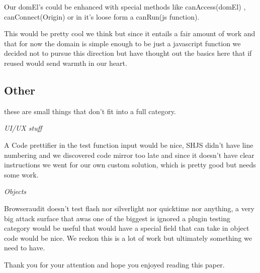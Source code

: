 Our domEl's could be enhanced with special methods like canAccess(domEl) , canConnect(Origin) or in it's loose form a canRun(js function).

This would be pretty cool we think but since it entails a fair amount of work and that for now the domain is simple enough to be just a javascript
function we decided not to pursue this direction but have thought out the basics here that if reused would send warmth in our heart. 

\subsection{Other}

these are small things that don't fit into a full category.

\emph{UI/UX stuff}

A Code prettifier in the test function input would be nice, SHJS didn't have line numbering and we discovered code mirror too late and since it doesn't have
clear instructions we went for our own custom solution, which is pretty good but needs some work.

\emph{Objects}

Browseraudit doesn't test flash nor silverlight nor quicktime nor anything, a very big attack surface that awas one of the biggest is ignored a plugin testing
category would be useful that would have a special field that can take in object code would be nice. We reckon this is a lot of work but ultimately something
we need to have.




Thank you for your attention and hope you enjoyed reading this paper.